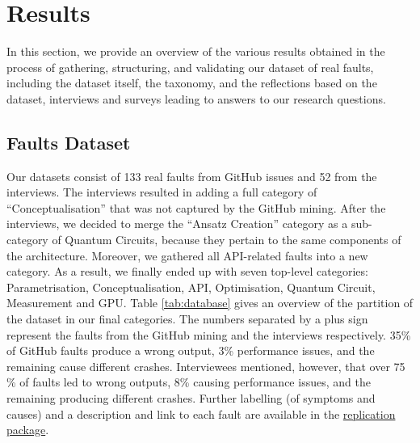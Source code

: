 \section{Results}
\label{results}
In this section, we provide an overview of the various results obtained in the process of gathering, structuring, and validating our dataset of real faults, including the dataset itself, the taxonomy, and the reflections based on the dataset, interviews and surveys leading to answers to our research questions.


\subsection{Faults Dataset}
Our datasets consist of 133 real faults from GitHub issues and 52 from the interviews. The interviews resulted in adding a full category of ``Conceptualisation'' that was not captured by the GitHub mining. After the interviews, we decided to merge the ``Ansatz Creation'' category as a sub-category of Quantum Circuits, because they pertain to the same components of the architecture. Moreover, we gathered all API-related faults into a new category. As a result, we finally ended up with seven top-level categories: Parametrisation, Conceptualisation, API, Optimisation, Quantum Circuit, Measurement and GPU. Table \ref{tab:database} gives an overview of the partition of the dataset in our final categories. The numbers separated by a plus sign represent the faults from the GitHub mining and the interviews respectively. 35\% of GitHub faults produce a wrong output, 3\% performance issues, and the remaining cause different crashes. Interviewees mentioned, however, that over 75 \% of faults led to wrong outputs, 8\% causing performance issues, and the remaining producing different crashes. Further labelling (of symptoms and causes) and a description and link to each fault are available in the \href{https://anonymous.4open.science/r/A-Taxonomy-of-Real-Faults-in-Hybrid-Quantum-Classical-Architectures-EE25/README.md}{replication package}.


